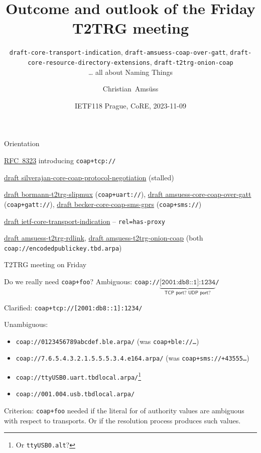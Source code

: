 \documentclass[aspectratio=169,colorlinks]{beamer}
\title{Outcome and outlook of the Friday T2TRG meeting}
\subtitle[]{
  \texttt{draft-core-transport-indication},
  \texttt{draft-amsuess-coap-over-gatt},
  \texttt{draft-core-resource-directory-extensions},
  \texttt{draft-t2trg-onion-coap}\\
  … all about Naming Things
}
\author{Christian~Amsüss}
\date{IETF118 Prague, CoRE, 2023-11-09}
\newcommand{\rfc}[1]{\href{https://datatracker.ietf.org/doc/html/rfc#1}{RFC~#1}}
\newcommand{\ietfdraft}[1]{\href{https://datatracker.ietf.org/doc/draft-#1/}{draft #1}}
\begin{document}
\frame{\titlepage}

\begin{frame}{Orientation}\large
  \begin{description}
    \item[Origin:] \rfc{8323} introducing \texttt{coap+tcp://}
    \item[led to:] \ietfdraft{silverajan-core-coap-protocol-negotiation} (stalled)
    \item[used by:] {\footnotesize \ietfdraft{bormann-t2trg-slipmux} (\texttt{coap+uart://}), \ietfdraft{amsuess-core-coap-over-gatt} (\texttt{coap+gatt://}), \ietfdraft{becker-core-coap-sms-gprs} (\texttt{coap+sms://})}
    \item[reboot:] \ietfdraft{ietf-core-transport-indication} -- \texttt{rel=has-proxy}
    \item[more users:] \ietfdraft{amsuess-t2trg-rdlink}, \ietfdraft{amsuess-t2trg-onion-coap} (both \texttt{coap://encodedpublickey.tbd.arpa})

      \bigskip

    \item T2TRG meeting on Friday
  \end{description}
\end{frame}

\begin{frame}{Do we really need \texttt{coap+foo}?}\large
  Ambiguous: \texttt{coap://$\underbrace{\texttt{[2001:db8::1]:1234}}_{\textsf{TCP port? UDP port?}}$/}

  Clarified: \texttt{coap+tcp://[2001:db8::1]:1234/}

  \bigskip

  Unambiguous:
  \begin{itemize}
    \item \texttt{coap://0123456789abcdef.ble.arpa/} (was \texttt{coap+ble://\ldots})
    \item \texttt{coap://7.6.5.4.3.2.1.5.5.5.3.4.e164.arpa/} (was \texttt{coap+sms://+43555\ldots})
    \item \texttt{coap://ttyUSB0.uart.tbdlocal.arpa/}\footnote{Or \texttt{ttyUSB0.alt}?} %
    \item \texttt{coap://001.004.usb.tbdlocal.arpa/}
  \end{itemize}

  \bigskip

  Criterion: \texttt{coap+foo} needed if the literal for of authority values are ambiguous with respect to transports. Or if the resolution process produces such values.
\end{frame}
\end{document}
